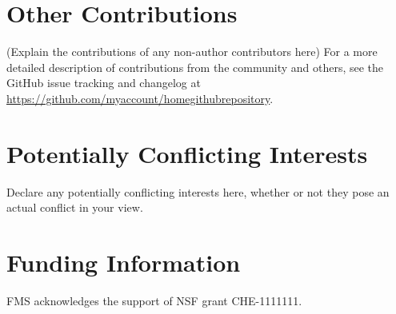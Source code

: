 \documentclass[9pt,bestpractices]{livecoms}
\newcommand{\githubrepository}{\url{https://github.com/myaccount/homegithubrepository}}  %
\begin{document}
\section{Other Contributions}
%

(Explain the contributions of any non-author contributors here)
For a more detailed description of contributions from the community and others, see the GitHub issue tracking and changelog at \githubrepository.

\section{Potentially Conflicting Interests}

Declare any potentially conflicting interests here, whether or not they pose an actual conflict in your view.

\section{Funding Information}
FMS acknowledges the support of NSF grant CHE-1111111.




\end{document}
